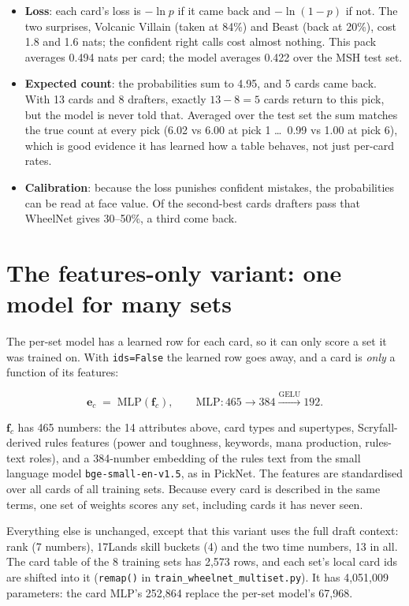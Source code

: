 \documentclass[11pt,letterpaper]{article}
\newcommand{\code}[1]{\texttt{\small #1}}
\begin{document}
\begin{itemize}
\item \textbf{Loss}: each card's loss is $-\ln p$ if it came back and $-\ln(1-p)$ if not. The two surprises,
Volcanic Villain (taken at 84\%) and Beast (back at 20\%), cost 1.8 and 1.6 nats; the confident right calls
cost almost nothing. This pack averages 0.494 nats per card; the model averages 0.422 over the MSH test set.
\item \textbf{Expected count}: the probabilities sum to 4.95, and 5 cards came back. With 13 cards and 8
drafters, exactly $13-8=5$ cards return to this pick, but the model is never told that. Averaged over the
test set the sum matches the true count at every pick (6.02 vs 6.00 at pick 1 \ldots\ 0.99 vs 1.00 at pick 6),
which is good evidence it has learned how a table behaves, not just per-card rates.
\item \textbf{Calibration}: because the loss punishes confident mistakes, the probabilities can be read at
face value. Of the second-best cards drafters pass that WheelNet gives 30--50\%, a third come back.
\end{itemize}

\section{The features-only variant: one model for many sets}\label{sec:multi}

The per-set model has a learned row for each card, so it can only score a set it was trained on. With
\code{ids=False} the learned row goes away, and a card is \emph{only} a function of its features:

\[
\mathbf{e}_c \;=\; \text{MLP}(\mathbf{f}_c), \qquad \text{MLP}: 465 \to 384 \xrightarrow{\text{GELU}} 192.
\]

$\mathbf{f}_c$ has 465 numbers: the 14 attributes above, card types and supertypes, Scryfall-derived rules
features (power and toughness, keywords, mana production, rules-text roles), and a 384-number embedding of
the rules text from the small language model \code{bge-small-en-v1.5}, as in PickNet. The features are
standardised over all cards of all training sets. Because every card is described in the same terms, one set
of weights scores any set, including cards it has never seen.

Everything else is unchanged, except that this variant uses the full draft context: rank (7 numbers),
17Lands skill buckets (4) and the two time numbers, 13 in all. The card table of the 8 training sets has
2,573 rows, and each set's local card ids are shifted into it (\code{remap()} in
\code{train\_wheelnet\_multiset.py}). It has 4,051,009 parameters: the card MLP's 252,864 replace the per-set
model's 67,968.
\end{document}
